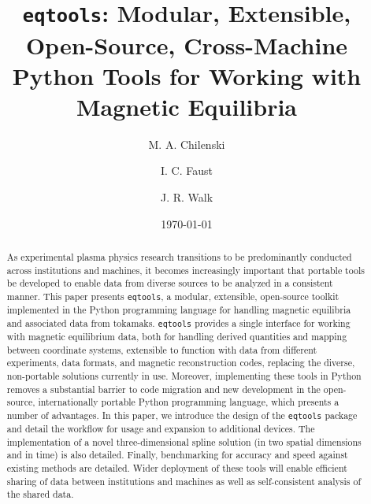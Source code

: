 \documentclass[12pt,floatfix,showpacs]{revtex4-1}
\newcommand{\gnote}[1]{\marginpar{\scriptsize\textcolor{red}{#1}}}
\newcommand{\eqtools}{\texttt{eqtools}\xspace}
\begin{document}
\title{\eqtools: Modular, Extensible, Open-Source, Cross-Machine Python Tools for Working with Magnetic Equilibria}

\author{M. A. Chilenski}

\author{I. C. Faust}

\author{J. R. Walk}

\date{\today}

\begin{abstract}
As experimental plasma physics research transitions to be predominantly conducted across institutions and machines, it becomes increasingly important that portable tools be developed to enable data from diverse sources to be analyzed in a consistent manner. This paper presents \eqtools, a modular, extensible, open-source toolkit implemented in the Python programming language for handling magnetic equilibria and associated data from tokamaks. \eqtools provides a single interface for working with magnetic equilibrium data, both for handling derived quantities and mapping between coordinate systems, extensible to function with data from different experiments, data formats, and magnetic reconstruction codes, replacing the diverse, non-portable solutions currently in use.  Moreover, implementing these tools in Python removes a substantial barrier to code migration and new development in the open-source, internationally portable\gnote{I want to emphasize that Python is not export-controlled (especially relevant to collaborate with China), whereas I recall MATLAB/IDL are. But this wording sounds awkward. Any ideas?} Python programming language, which presents a number of advantages.  In this paper, we introduce the design of the \eqtools package and detail the workflow for usage and expansion to additional devices.  The implementation of a novel three-dimensional spline solution (in two spatial dimensions and in time) is also detailed.  Finally, benchmarking for accuracy and speed against existing methods are detailed. Wider deployment of these tools will enable efficient sharing of data between institutions and machines as well as self-consistent analysis of the shared data.
\end{abstract}
\gnote{other PACs numbers?}


\maketitle
\end{document}
